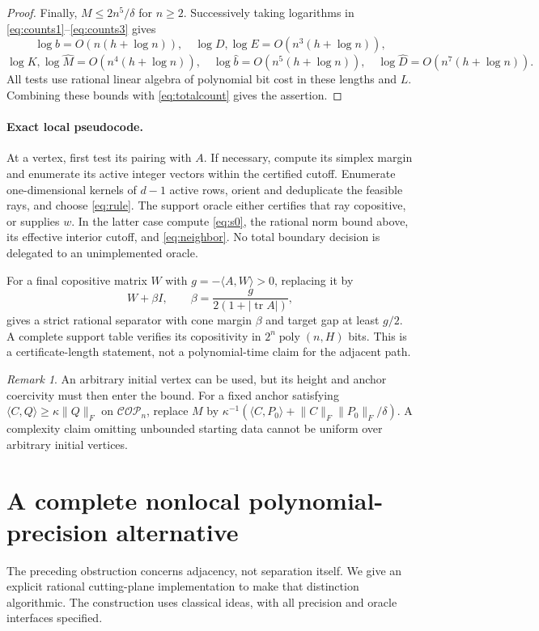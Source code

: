 \documentclass[11pt]{article}
\theoremstyle{remark}\newtheorem{remark}[theorem]{Remark}
\newcommand{\COP}{\mathcal{COP}}
\newcommand{\tr}{\operatorname{tr}}
\newcommand{\ip}[2]{\langle #1,#2\rangle}
\newcommand{\norm}[1]{\lVert#1\rVert}
\begin{document}
\begin{proof}
Finally, $M\le2n^5/\delta$ for $n\ge2$. Successively taking logarithms in \eqref{eq:counts1}--\eqref{eq:counts3} gives
\[
 \log b=O(n(h+\log n)),\quad \log D,\log E=O(n^3(h+\log n)),
\]
\[
 \log K,\log\widehat M=O(n^4(h+\log n)),\quad
 \log\widehat b=O(n^5(h+\log n)),\quad
 \log\widehat D=O(n^7(h+\log n)).
\]
All tests use rational linear algebra of polynomial bit cost in these lengths and $L$. Combining these bounds with \eqref{eq:totalcount} gives the assertion.
\end{proof}

\paragraph{Exact local pseudocode.}
At a vertex, first test its pairing with $A$. If necessary, compute its simplex margin and enumerate its active integer vectors within the certified cutoff. Enumerate one-dimensional kernels of $d-1$ active rows, orient and deduplicate the feasible rays, and choose \eqref{eq:rule}. The support oracle either certifies that ray copositive, or supplies $w$. In the latter case compute \eqref{eq:s0}, the rational norm bound above, its effective interior cutoff, and \eqref{eq:neighbor}. No total boundary decision is delegated to an unimplemented oracle.

For a final copositive matrix $W$ with $g=-\ip AW>0$, replacing it by
\[
 W+\beta I,\qquad \beta=\frac{g}{2(1+|\tr A|)},
\]
gives a strict rational separator with cone margin $\beta$ and target gap at least $g/2$. A complete support table verifies its copositivity in $2^n\operatorname{poly}(n,H)$ bits. This is a certificate-length statement, not a polynomial-time claim for the adjacent path.

\begin{remark}
An arbitrary initial vertex can be used, but its height and anchor coercivity must then enter the bound. For a fixed anchor satisfying $\ip CQ\ge\kappa\norm Q_F$ on $\COP_n$, replace $M$ by
$\kappa^{-1}(\ip C{P_0}+\norm C_F\norm{P_0}_F/\delta)$.
A complexity claim omitting unbounded starting data cannot be uniform over arbitrary initial vertices.
\end{remark}

\section{A complete nonlocal polynomial-precision alternative}\label{sec:nonlocal}
The preceding obstruction concerns adjacency, not separation itself. We give an explicit rational cutting-plane implementation to make that distinction algorithmic. The construction uses classical ideas, with all precision and oracle interfaces specified.
\end{document}
